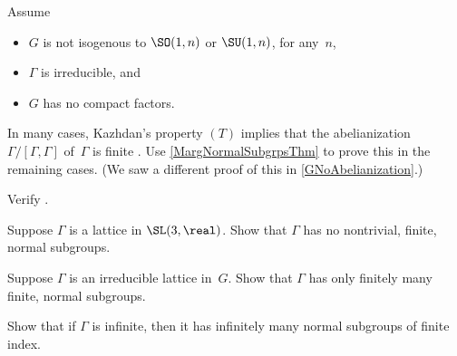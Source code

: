 \begin{exercises}

\item \label{GammaHasFiniteAbelianization}
Assume 
	\begin{itemize}
	\item $G$ is not isogenous to $\SO(1,n)$ or $\SU(1,n)$, for any~$n$,
	\item $\Gamma$ is irreducible,
	and
	\item $G$ has no compact factors.
	\end{itemize}
In many cases, Kazhdan's property $(T)$ implies that the abelianization $\Gamma / [\Gamma,\Gamma]$ of~$\Gamma$ is finite . Use \cref{MargNormalSubgrpsThm} to prove this in the remaining cases. (We saw a different proof of this in \cref{GNoAbelianization}.)

\item \label{MargNormSubgrpRems-hyp-redEx}
Verify .

\item Suppose $\Gamma$ is a lattice in $\SL(3,\real)$. Show that $\Gamma$ has no nontrivial, finite, normal subgroups.

\item Suppose $\Gamma$ is an irreducible lattice in~$G$. Show that $\Gamma$ has only finitely many finite, normal subgroups.

\item \label{MargNormSubgrpRems-finindEx}
Show that if $\Gamma$ is infinite, then it has infinitely many normal subgroups of finite index.


\end{exercises}

